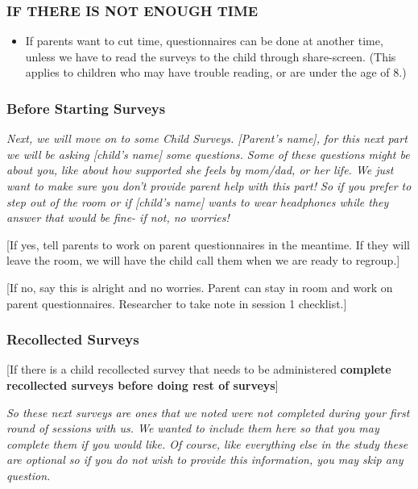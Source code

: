 \documentclass[]{book}
\providecommand{\tightlist}{%
  \setlength{\itemsep}{0pt}\setlength{\parskip}{0pt}}
\begin{document}
\hypertarget{if-there-is-not-enough-time-1}{%
\subsubsection{IF THERE IS NOT ENOUGH TIME}\label{if-there-is-not-enough-time-1}}

\begin{itemize}
\tightlist
\item
  If parents want to cut time, questionnaires can be done at another time, unless we have to read the surveys to the child through share-screen. (This applies to children who may have trouble reading, or are under the age of 8.)
\end{itemize}

\hypertarget{before-starting-surveys}{%
\subsubsection{Before Starting Surveys}\label{before-starting-surveys}}

\emph{Next, we will move on to some Child Surveys. {[}Parent's name{]}, for this next part we will be asking {[}child's name{]} some questions. Some of these questions might be about you, like about how supported she feels by mom/dad, or her life. We just want to make sure you don't provide parent help with this part! So if you prefer to step out of the room or if {[}child's name{]} wants to wear headphones while they answer that would be fine- if not, no worries!}

{[}If yes, tell parents to work on parent questionnaires in the meantime. If they will leave the room, we will have the child call them when we are ready to regroup.{]}

{[}If no, say this is alright and no worries. Parent can stay in room and work on parent questionnaires. Researcher to take note in session 1 checklist.{]}

\hypertarget{recollected-surveys}{%
\subsubsection{Recollected Surveys}\label{recollected-surveys}}

{[}If there is a child recollected survey that needs to be administered \textbf{complete recollected surveys before doing rest of surveys}{]}

\emph{So these next surveys are ones that we noted were not completed during your first round of sessions with us. We wanted to include them here so that you may complete them if you would like. Of course, like everything else in the study these are optional so if you do not wish to provide this information, you may skip any question.}
\end{document}
